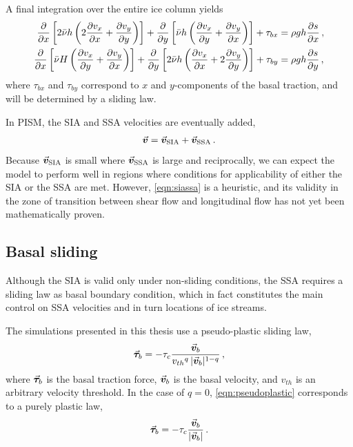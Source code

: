 \documentclass{article}
\newcommand{\vect}[1]{\va*{#1}} %
\newcommand{\vv}[0]{\vect{v}}           %
\newcommand{\vsia}[0]{\vv_{\mathrm{SIA}}}   %
\newcommand{\vssa}[0]{\vv_{\mathrm{SSA}}}   %
\begin{document}
A final integration over the entire ice column yields
\begin{subequations}
\begin{align}
    \label{eqn:vssa}
    \pdv{x} \left[2\bar{\nu}h
                  \left(2\pdv{v_x}{x} + \pdv{v_y}{y}\right) \right]
        + \pdv{y} \left[\bar{\nu}h
                        \left(\pdv{v_x}{y} + \pdv{v_y}{x}\right) \right]
        + \tau_{bx} &= \rho gh \pdv{s}{x} \,, \\
    \pdv{x} \left[\bar{\nu}H
                  \left(\pdv{v_x}{y} + \pdv{v_y}{x}\right) \right]
        + \pdv{y} \left[2\bar{\nu}h
                        \left(\pdv{v_x}{x} + 2\pdv{v_y}{y}\right) \right]
        + \tau_{by} &= \rho gh \pdv{s}{y} \,,
\end{align}
\end{subequations}
where $\tau_{bx}$ and $\tau_{by}$ correspond to $x$ and $y$-components of the
basal traction, and will be determined by a sliding law.

In PISM, the SIA and SSA velocities are eventually added,
\begin{equation}
    \label{eqn:siassa}
    \vv = \vsia + \vssa \,.
\end{equation}
Because $\vsia$ is small where $\vssa$ is large and
reciprocally, we can expect the model to perform well in regions where
conditions for applicability of either the SIA or the SSA are met. However,
\cref{eqn:siassa} is a heuristic, and its validity in the zone of
transition between shear flow and longitudinal flow has not yet been
mathematically proven.


\subsection{Basal sliding}

Although the SIA is valid only under non-sliding conditions, the SSA requires
a sliding law as basal boundary condition, which in fact constitutes the main
control on SSA velocities and in turn locations of ice streams.

The simulations presented in this thesis use a pseudo-plastic sliding law,
\begin{equation}
    \label{eqn:pseudoplastic}
    \vect{\tau}_b = -\tau_c \frac{\vv_b}{{v_{th}}^q\,|\vv_b|^{1-q}} \,,
\end{equation}
where $\vect{\tau}_b$ is the basal traction force, $\vv_b$ is the basal
velocity, and $v_{th}$ is an arbitrary velocity threshold. In the case of
$q=0$, \cref{eqn:pseudoplastic} corresponds to a purely plastic law,
\begin{equation}
    \label{eqn:plastic}
    \vect{\tau}_b = -\tau_c \frac{\vv_b}{|\vv_b|} \,.
\end{equation}
\end{document}
